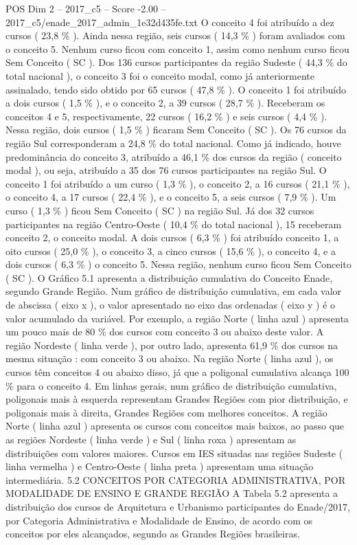 \begin{textsample}{POS Dim 2 – 2017\_c5 – Score -2.00 – 2017\_c5/enade\_2017\_admin\_1e32d435fe.txt}
O conceito 4 foi atribuído a dez cursos ( 23,8 \% ).
Ainda nessa região, seis cursos ( 14,3 \% ) foram avaliados com o conceito 5.
Nenhum curso ficou com conceito 1, assim como nenhum curso ficou Sem Conceito ( SC ).
Dos 136 cursos participantes da região Sudeste ( 44,3 \% do total nacional ), o conceito 3 foi o conceito modal, como já anteriormente assinalado, tendo sido obtido por 65 cursos ( 47,8 \% ).
O conceito 1 foi atribuído a dois cursos ( 1,5 \% ), e o conceito 2, a 39 cursos ( 28,7 \% ).
Receberam os conceitos 4 e 5, respectivamente, 22 cursos ( 16,2 \% ) e seis cursos ( 4,4 \% ).
Nessa região, dois cursos ( 1,5 \% ) ficaram Sem Conceito ( SC ).
Os 76 cursos da região Sul corresponderam a 24,8 \% do total nacional.
Como já indicado, houve predominância do conceito 3, atribuído a 46,1 \% dos cursos da região ( conceito modal ), ou seja, atribuído a 35 dos 76 cursos participantes na região Sul.
O conceito 1 foi atribuído a um curso ( 1,3 \% ), o conceito 2, a 16 cursos ( 21,1 \% ), o conceito 4, a 17 cursos ( 22,4 \% ), e o conceito 5, a seis cursos ( 7,9 \% ).
Um curso ( 1,3 \% ) ficou Sem Conceito ( SC ) na região Sul.
Já dos 32 cursos participantes na região Centro-Oeste ( 10,4 \% do total nacional ), 15 receberam conceito 2, o conceito modal.
A dois cursos ( 6,3 \% ) foi atribuído conceito 1, a oito cursos ( 25,0 \% ), o conceito 3, a cinco cursos ( 15,6 \% ), o conceito 4, e a dois cursos ( 6,3 \% ) o conceito 5.
Nessa região, nenhum curso ficou Sem Conceito ( SC ).
O Gráfico 5.1 apresenta a distribuição cumulativa do Conceito Enade, segundo Grande Região.
Num gráfico de distribuição cumulativa, em cada valor de abscissa ( eixo x ), o valor apresentado no eixo das ordenadas ( eixo y ) é o valor acumulado da variável.
Por exemplo, a região Norte ( linha azul ) apresenta um pouco mais de 80 \% dos cursos com conceito 3 ou abaixo deste valor.
A região Nordeste ( linha verde ), por outro lado, apresenta 61,9 \% dos cursos na mesma situação : com conceito 3 ou abaixo.
Na região Norte ( linha azul ), os cursos têm conceitos 4 ou abaixo disso, já que a poligonal cumulativa alcança 100 \% para o conceito 4.
Em linhas gerais, num gráfico de distribuição cumulativa, poligonais mais à esquerda representam Grandes Regiões com pior distribuição, e poligonais mais à direita, Grandes Regiões com melhores conceitos.
A região Norte ( linha azul ) apresenta os cursos com conceitos mais baixos, ao passo que as regiões Nordeste ( linha verde ) e Sul ( linha roxa ) apresentam as distribuições com valores maiores.
Cursos em IES situadas nas regiões Sudeste ( linha vermelha ) e Centro-Oeste ( linha preta ) apresentam uma situação intermediária. 5.2 CONCEITOS POR CATEGORIA ADMINISTRATIVA, POR MODALIDADE DE ENSINO E GRANDE REGIÃO A Tabela 5.2 apresenta a distribuição dos cursos de Arquitetura e Urbanismo participantes do Enade/2017, por Categoria Administrativa e Modalidade de Ensino, de acordo com os conceitos por eles alcançados, segundo as Grandes Regiões brasileiras.

\end{textsample}
